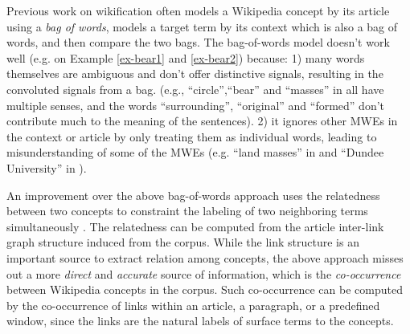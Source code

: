 

Previous work on wikification often models a Wikipedia concept by its article using a {\em bag of
words}, models a target term by its context
which is also a bag of words, and then compare the two bags.
The bag-of-words model doesn't work well
(e.g. on Example \ref{ex-bear1} and \ref{ex-bear2}) because:
1) many words themselves are ambiguous and don't offer distinctive
signals, resulting in the convoluted signals from a bag.
(e.g., ``circle'',``bear'' and ``masses'' in 
all have multiple senses, and the words ``surrounding'',
``original'' and ``formed'' don't contribute much to the meaning of the
sentences).
2) it ignores other MWEs in the context or article by only treating them
as individual words, leading to misunderstanding of
some of the MWEs (e.g. ``land masses'' in 
and ``Dundee University'' in ).

An improvement over the above bag-of-words approach
uses the relatedness between two concepts to constraint
the labeling of two neighboring terms simultaneously
\cite{Tonelli2012,RatinovRDA11,kulkarni2009collective}. %
The relatedness can be computed from the article inter-link graph structure
induced from the corpus\cite{ferragina2010tagme}.%
While the link structure is an important source to extract
relation among concepts, the above approach misses out a more
{\em direct} and {\em accurate} source of information,
which is the {\em co-occurrence} between Wikipedia concepts in the corpus.
Such co-occurrence can be computed
by the co-occurrence of links within an article, a paragraph, or a predefined window,
since the links are the natural labels of surface terms to the concepts.

